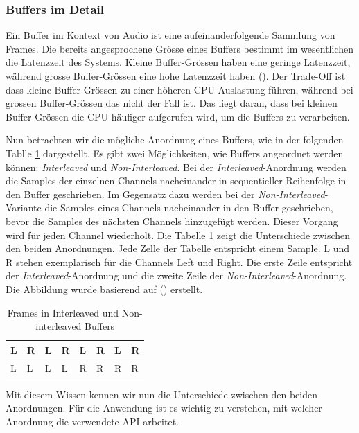 \documentclass[11pt,a4paper]{article}
\begin{document}
\subsubsection{Buffers im Detail}
Ein Buffer im Kontext von Audio ist eine aufeinanderfolgende Sammlung von Frames. Die bereits
angesprochene Grösse eines Buffers bestimmt im wesentlichen die Latenzzeit des Systems. Kleine
Buffer-Grössen haben eine geringe Latenzzeit, während grosse Buffer-Grössen eine hohe Latenzzeit
haben (\cite[p.10]{somberg2019audioapi}). Der Trade-Off ist dass kleine Buffer-Grössen
zu einer höheren CPU-Auslastung führen, während bei grossen Buffer-Grössen das nicht der Fall ist.
Das liegt daran, dass bei kleinen Buffer-Grössen die CPU häufiger aufgerufen wird, um die Buffers
zu verarbeiten.

\noindent \newline
Nun betrachten wir die mögliche Anordnung eines Buffers, wie in der folgenden Tablle 
\ref{tab:frames_buffers} dargestellt. Es gibt zwei Möglichkeiten, wie Buffers angeordnet werden
können: \textit{Interleaved} und \textit{Non-Interleaved}. Bei der \textit{Interleaved}-Anordnung
werden die Samples der einzelnen Channels nacheinander in sequentieller Reihenfolge in den Buffer
geschrieben. Im Gegensatz dazu werden bei der \textit{Non-Interleaved}-Variante die Samples
eines Channels nacheinander in den Buffer geschrieben, bevor die Samples des nächsten Channels
hinzugefügt werden. Dieser Vorgang wird für jeden Channel wiederholt. Die Tabelle
\ref{tab:frames_buffers} zeigt die Unterschiede zwischen den beiden Anordnungen. Jede Zelle der
Tabelle entspricht einem Sample. L und R stehen exemplarisch für die Channels Left und Right.
Die erste Zeile entspricht der \textit{Interleaved}-Anordnung und die zweite Zeile der
\textit{Non-Interleaved}-Anordnung. Die Abbildung wurde basierend auf
(\cite[p.11]{somberg2019audioapi}) erstellt.

\begin{table}[h]
	\centering
	\begin{tabularx}{\textwidth}{|X|X|X|X|X|X|X|X|}
		\hline
		L & R & L & R & L & R & L & R \\
		\hline
		L & L & L & L & R & R & R & R \\
		\hline
	\end{tabularx}
	\caption{Frames in Interleaved und Non-interleaved Buffers}
	\label{tab:frames_buffers}
\end{table}

\noindent
Mit diesem Wissen kennen wir nun die Unterschiede zwischen den beiden Anordnungen. Für die
Anwendung ist es wichtig zu verstehen, mit welcher Anordnung die verwendete API arbeitet.
\end{document}
